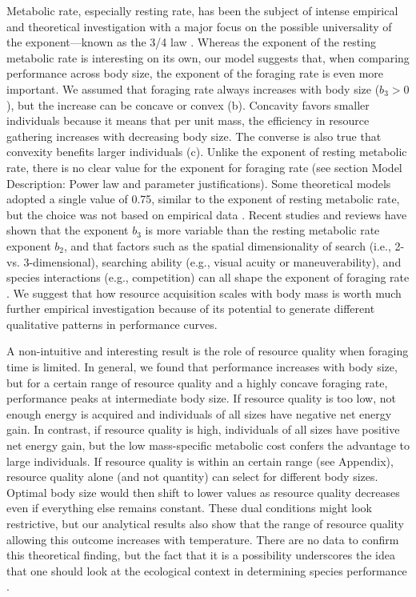 Metabolic rate, especially resting rate, has been the subject of intense empirical and theoretical investigation with a major focus on the possible universality of the exponent---known as the 3/4 law \citep{Peters1986,West1997, Kozlowski1997, Brown2004, Isaac2010}.
Whereas the exponent of the resting metabolic rate is interesting on its own, our model suggests that, when comparing performance across body size, the exponent of the foraging rate is even more important.
We assumed that foraging rate always increases with body size ($b_3 > 0$), but the increase can be concave or convex (b).
Concavity favors smaller individuals because it means that per unit mass, the efficiency in resource gathering increases with decreasing body size.
The converse is also true that convexity benefits larger individuals (c).
Unlike the exponent of resting metabolic rate, there is no clear value for the exponent for foraging rate (see section Model Description: Power law and parameter justifications).
Some theoretical models adopted a single value of 0.75, similar to the exponent of resting metabolic rate, but the choice was not based on empirical data \citep{Yodzis1992, Brown1993}.
Recent studies and reviews have shown that the exponent $b_3$ is more variable than the resting metabolic rate exponent $b_2$, and that factors such as the spatial dimensionality of search (i.e., 2- vs. 3-dimensional), searching ability (e.g., visual acuity or maneuverability), and species interactions (e.g., competition) can all shape the exponent of foraging rate \citep{Pawar2012, Kalinkat2015}.
We suggest that how resource acquisition scales with body mass is worth much further empirical investigation because of its potential to generate different qualitative patterns in performance curves.

A non-intuitive and interesting result is the role of resource quality when foraging time is limited.
In general, we found that performance increases with body size, but for a certain range of resource quality and a highly concave foraging rate, performance peaks at intermediate body size.
If resource quality is too low, not enough energy is acquired and individuals of all sizes have negative net energy gain.
In contrast, if resource quality is high, individuals of all sizes have positive net energy gain, but the low mass-specific metabolic cost confers the advantage to large individuals.
If resource quality is within an certain range (see Appendix), resource quality alone (and not quantity) can select for different body sizes.
Optimal body size would then shift to lower values as resource quality decreases even if everything else remains constant.
These dual conditions might look restrictive, but our analytical results also show that the range of resource quality allowing this outcome increases with temperature.
There are no data to confirm this theoretical finding, but the fact that it is a possibility underscores the idea that one should look at the ecological context in determining species performance \citep{Sears2015}.


